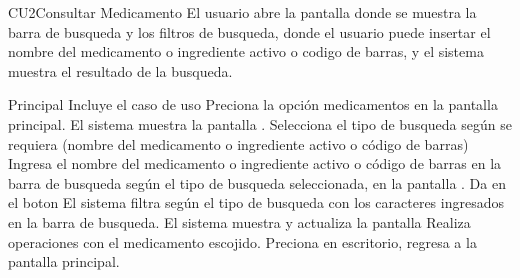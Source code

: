 \begin{UseCase}{CU2}{Consultar Medicamento}{
		El usuario abre la pantalla  donde se muestra la barra de busqueda y los filtros de busqueda, donde el usuario puede insertar el nombre del medicamento o ingrediente activo o codigo de barras, y el sistema muestra el resultado de la busqueda.
	}
\end{UseCase} 	
\begin{UCtrayectoria}{Principal}
	\UCpaso Incluye el caso de uso 
	\UCpaso [\UCactor] Preciona la opción medicamentos en la pantalla principal.
	\UCpaso El sistema muestra la pantalla .
	\UCpaso [\UCactor] Selecciona el tipo de busqueda según se requiera (nombre del medicamento o ingrediente activo o código de barras)
	\UCpaso [\UCactor] Ingresa el nombre del medicamento o ingrediente activo o código de barras en la barra de busqueda según el tipo de busqueda seleccionada, en la pantalla .		
	\UCpaso [\UCactor] Da en el boton 
	\UCpaso El sistema filtra según el tipo de busqueda con los caracteres ingresados en la barra de busqueda.
	\UCpaso El sistema muestra y actualiza la pantalla  
	\UCpaso [\UCactor] Realiza operaciones con el medicamento escojido.
	\UCpaso [\UCactor] Preciona en escritorio, regresa a la pantalla principal.
\end{UCtrayectoria}

